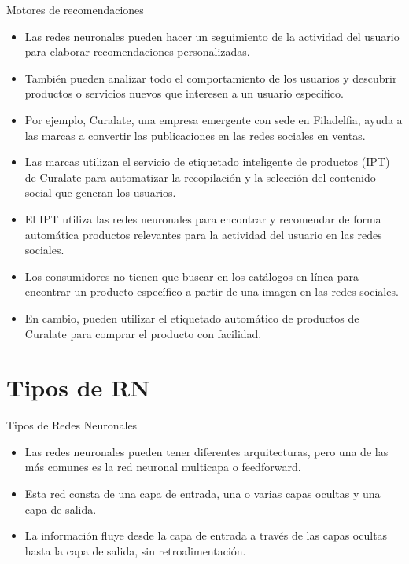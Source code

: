 \documentclass[11pt,aspectratio=169]{beamer}
\begin{document}
\begin{frame}{Motores de recomendaciones}
	\begin{itemize}
		\item Las redes neuronales pueden hacer un seguimiento de la actividad del usuario para elaborar recomendaciones personalizadas.\pause
		\item También pueden analizar todo el comportamiento de los usuarios y descubrir productos o servicios nuevos que interesen a un 
			usuario específico.\pause
		\item Por ejemplo, Curalate, una empresa emergente con sede en Filadelfia, ayuda a las marcas a convertir las publicaciones en las 
			redes sociales en ventas.\pause 
		\item Las marcas utilizan el servicio de etiquetado inteligente de productos (IPT) de Curalate para automatizar la recopilación y 
			la selección del contenido social que generan los usuarios.\pause
		\item El IPT utiliza las redes neuronales para encontrar y recomendar de forma automática productos relevantes para la actividad 
			del usuario en las redes sociales.\pause 
		\item Los consumidores no tienen que buscar en los catálogos en línea para encontrar un producto específico a partir de una imagen 
			en las redes sociales.\pause  
		\item En cambio, pueden utilizar el etiquetado automático de productos de Curalate para comprar el producto con facilidad.
	\end{itemize}
\end{frame}

\section{Tipos de RN}
\begin{frame}{Tipos de Redes Neuronales}
	\begin{itemize}
		\item Las redes neuronales pueden tener diferentes arquitecturas, pero una de las más comunes es la red neuronal multicapa o 
			feedforward.\pause 
		\item Esta red consta de una capa de entrada, una o varias capas ocultas y una capa de salida.\pause
		\item La información fluye desde la capa de entrada a través de las capas ocultas hasta la capa de salida, sin retroalimentación.
	\end{itemize}
\end{frame}
\end{document}
